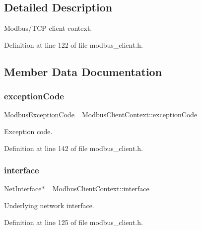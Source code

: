 \subsection{Detailed Description}
Modbus/\+T\+CP client context. 

Definition at line 122 of file modbus\+\_\+client.\+h.



\subsection{Member Data Documentation}
\mbox{\label{struct__ModbusClientContext_ac9346c6c908920babfcbe9f26e5ac261}} 
\subsubsection{\texorpdfstring{exception\+Code}{exceptionCode}}
{\footnotesize\ttfamily \hyperlink{modbus__common_8h_a0b7f726dfaa2b4cf98aaaed1eb42fa72}{Modbus\+Exception\+Code} \+\_\+\+Modbus\+Client\+Context\+::exception\+Code}



Exception code. 



Definition at line 142 of file modbus\+\_\+client.\+h.

\mbox{\label{struct__ModbusClientContext_a0454bc60a65f66642aa5d86d18650e8e}} 
\subsubsection{\texorpdfstring{interface}{interface}}
{\footnotesize\ttfamily \hyperlink{net_8h_a2234db8911a1148c9159979d8f5e0d6b}{Net\+Interface}$\ast$ \+\_\+\+Modbus\+Client\+Context\+::interface}



Underlying network interface. 



Definition at line 125 of file modbus\+\_\+client.\+h.

